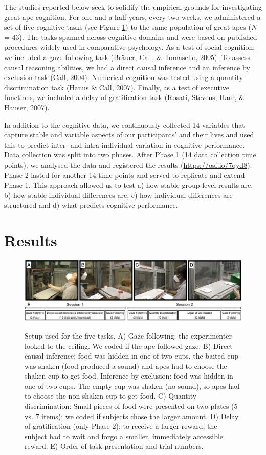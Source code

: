 \documentclass[
  man,floatsintext]{apa6}
\begin{document}
The studies reported below seek to solidify the empirical grounds for investigating great ape cognition. For one-and-a-half years, every two weeks, we administered a set of five cognitive tasks (see Figure \ref{fig:setup}) to the same population of great apes (\emph{N} = 43). The tasks spanned across cognitive domains and were based on published procedures widely used in comparative psychology. As a test of social cognition, we included a gaze following task (Bräuer, Call, \& Tomasello, 2005). To assess causal reasoning abilities, we had a direct causal inference and an inference by exclusion task (Call, 2004). Numerical cognition was tested using a quantity discrimination task (Hanus \& Call, 2007). Finally, as a test of executive functions, we included a delay of gratification task (Rosati, Stevens, Hare, \& Hauser, 2007).

In addition to the cognitive data, we continuously collected 14 variables that capture stable and variable aspects of our participants' and their lives and used this to predict inter- and intra-individual variation in cognitive performance. Data collection was split into two phases. After Phase 1 (14 data collection time points), we analysed the data and registered the results (\url{https://osf.io/7qyd8}). Phase 2 lasted for another 14 time points and served to replicate and extend Phase 1. This approach allowed us to test a) how stable group-level results are, b) how stable individual differences are, c) how individual differences are structured and d) what predicts cognitive performance.

\hypertarget{results}{%
\section{Results}\label{results}}

\begin{figure}
\includegraphics[width=1\linewidth]{./figures/setup} \caption{Setup used for the five tasks. A) Gaze following: the experimenter looked to the ceiling. We coded if the ape followed gaze. B) Direct causal inference: food was hidden in one of two cups, the baited cup was shaken (food produced a sound) and apes had to choose the shaken cup to get food. Inference by exclusion: food was hidden in one of two cups. The empty cup was shaken (no sound), so apes had to choose the non-shaken cup to get food. C) Quantity discrimination: Small pieces of food were presented on two plates (5 vs. 7 items); we coded if subjects chose the larger amount. D) Delay of gratification (only Phase 2): to receive a larger reward, the subject had to wait and forgo a smaller, immediately accessible reward. E) Order of task presentation and trial numbers.}\label{fig:setup}
\end{figure}
\end{document}
